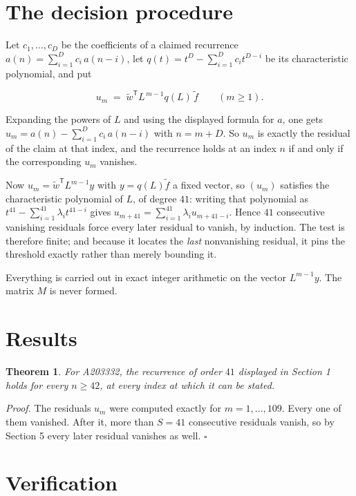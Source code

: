 \documentclass[11pt]{article}
\newtheorem{theorem}{Theorem}
\theoremstyle{definition}
\begin{document}
\section{The decision procedure}

Let $c_1,\dots,c_D$ be the coefficients of a claimed recurrence $a(n) = \sum_{i=1}^{D} c_i\,a(n-i)$, let $q(t) = t^{D} - \sum_{i=1}^{D} c_i t^{D-i}$ be its characteristic polynomial, and put

\[u_m \;=\; \tilde w^{\mathsf T} L^{\,m-1} q(L)\,\tilde f \qquad (m \ge 1).\]

Expanding the powers of $L$ and using the displayed formula for $a$, one gets $u_m = a(n) - \sum_{i=1}^{D} c_i\,a(n-i)$ with $n = m + D$. So $u_m$ is exactly the residual of the claim at that index, and the recurrence holds at an index $n$ if and only if the corresponding $u_m$ vanishes.

Now $u_m = \tilde w^{\mathsf T} L^{m-1} y$ with $y = q(L)\tilde f$ a fixed vector, so $(u_m)$ satisfies the characteristic polynomial of $L$, of degree $41$: writing that polynomial as $t^{41} - \sum_{i=1}^{41} \lambda_i t^{41-i}$ gives $u_{m+41} = \sum_{i=1}^{41} \lambda_i u_{m+41-i}$. Hence $41$ consecutive vanishing residuals force every later residual to vanish, by induction. The test is therefore finite; and because it locates the {\itshape last} nonvanishing residual, it pins the threshold exactly rather than merely bounding it.

Everything is carried out in exact integer arithmetic on the vector $L^{m-1}y$. The matrix $M$ is never formed.

\section{Results}

\begin{theorem} For A203332, the recurrence of order $41$ displayed in Section 1 holds for every $n \ge 42$, at every index at which it can be stated.\end{theorem}

{\itshape Proof.} The residuals $u_m$ were computed exactly for $m = 1,\dots,109$. Every one of them vanished. After it, more than $S = 41$ consecutive residuals vanish, so by Section 5 every later residual vanishes as well. $\square$

\section{Verification}
\end{document}
